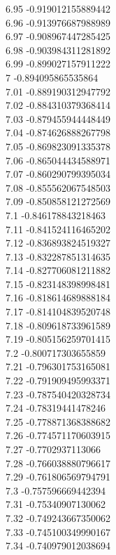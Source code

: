 {6.95	-0.919012155889442\\
6.96	-0.913976687988989\\
6.97	-0.908967447285425\\
6.98	-0.903984311281892\\
6.99	-0.899027157911222\\
7	-0.894095865535864\\
7.01	-0.889190312947792\\
7.02	-0.884310379368414\\
7.03	-0.879455944448449\\
7.04	-0.874626888267798\\
7.05	-0.869823091335378\\
7.06	-0.865044434588971\\
7.07	-0.860290799395034\\
7.08	-0.855562067548503\\
7.09	-0.850858121272569\\
7.1	-0.846178843218463\\
7.11	-0.841524116465202\\
7.12	-0.836893824519327\\
7.13	-0.832287851314635\\
7.14	-0.827706081211882\\
7.15	-0.823148398998481\\
7.16	-0.818614689888184\\
7.17	-0.814104839520748\\
7.18	-0.809618733961589\\
7.19	-0.805156259701415\\
7.2	-0.800717303655859\\
7.21	-0.796301753165081\\
7.22	-0.791909495993371\\
7.23	-0.787540420328734\\
7.24	-0.78319441478246\\
7.25	-0.778871368388682\\
7.26	-0.774571170603915\\
7.27	-0.7702937113066\\
7.28	-0.766038880796617\\
7.29	-0.761806569794791\\
7.3	-0.757596669442394\\
7.31	-0.75340907130062\\
7.32	-0.749243667350062\\
7.33	-0.745100349990167\\
7.34	-0.740979012038694\\
}
